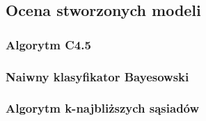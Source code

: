 \documentclass[11pt]{article} %
\begin{document}
\subsection{Ocena stworzonych modeli}

\subsubsection{Algorytm C4.5}

\subsubsection{Naiwny klasyfikator Bayesowski}

\subsubsection{Algorytm k-najbliższych sąsiadów}
\end{document}
